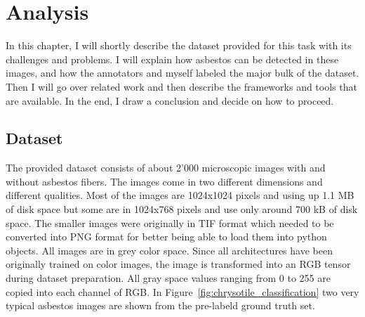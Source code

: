 \chapter{Analysis}

In this chapter, I will shortly describe the dataset provided for this task with its challenges and problems. I will explain how asbestos can be detected in these images, and how the annotators and myself labeled the major bulk of the dataset. Then I will go over related work and then describe the frameworks and tools that are available. In the end, I draw a conclusion and decide on how to proceed.

\section{Dataset}


The provided dataset consists of about 2'000 microscopic images with and without asbestos fibers. The images come in two different dimensions and different qualities. Most of the images are 1024x1024 pixels and using up 1.1 MB of disk space but some are in 1024x768 pixels and use only around 700 kB of disk space. The smaller images were originally in TIF format which needed to be converted into PNG format for better being able to load them into python objects. All images are in grey color space. Since all architectures have been originally trained on color images, the image is transformed into an RGB tensor during dataset preparation. All gray space values ranging from 0 to 255 are copied into each channel of RGB. In Figure~\ref{fig:chrysotile_classification} two very typical asbestos images are shown from the pre-labeld ground truth set.

